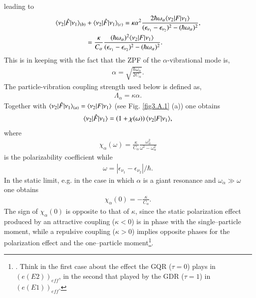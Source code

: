 leading to 
\begin{align}
\nonumber \langle {\nu_2|\hat F|\nu_1} \rangle_{(b)}&+\langle {\nu_2|\hat F|\nu_1} \rangle_{(c)}=\kappa\alpha^2\frac{2\hbar \omega_\alpha\langle {\nu_2|F|\nu_1} \rangle}{(\epsilon_{\nu_1}-\epsilon_{\nu_2})^2-(\hbar\omega_\alpha)^2},\\
&=\frac{\kappa}{C_\alpha}\frac{(\hbar\omega_\alpha)^2\langle {\nu_2|F|\nu_1} \rangle}{(\epsilon_{\nu_1}-\epsilon_{\nu_2})^2-(\hbar\omega_\alpha)^2}.
\end{align}
This is in keeping with the fact that the ZPF of the $\alpha$-vibrational mode is,
\begin{align}
\alpha=\sqrt{\frac{\hbar\omega_\alpha}{2C_\alpha}}.
\end{align}
The particle-vibration coupling strength used below is defined as,
\begin{align}
\Lambda_\alpha=\kappa\alpha.
\end{align}
Together with $\langle {\nu_2|\hat F|\nu_1} \rangle_{(a)}=\langle {\nu_2|F|\nu_1} \rangle$ (see Fig. \ref{fig3.A.1} (a)) one obtains
\begin{align}\label{eq3.A.12}
\langle {\nu_2|\hat F|\nu_1} \rangle=\left(1+\chi(\omega)\right)\langle {\nu_2|F|\nu_1} \rangle,
\end{align}
where
\begin{align}\label{eq3.A.13}
 \chi_\alpha(\omega)=\frac{\kappa}{C_\alpha}\frac{\omega_\alpha^2}{\omega^2-\omega_\alpha^2}
\end{align}
is the polarizability coefficient while
\begin{align}\label{eq3.A.14}
\omega=|\epsilon_{\nu_1}-\epsilon_{\nu_2}|/\hbar.
\end{align}
In the static limit, e.g. in the case in which $\alpha$ is a giant resonance and $\omega_\alpha\gg\omega$ one obtains
\begin{align}\label{eq3.A.15}
\chi_\alpha(0)=-\frac{\kappa}{C_\alpha}.
\end{align}
The sign of $\chi_\alpha(0)$ is opposite to that of $\kappa$, since the static polarization effect produced by an attractive coupling ($\kappa<0$) is in phase with the single--particle moment, while a repulsive coupling ($\kappa>0$) implies opposite phases for the polarization effect and the one--particle moment\footnote{\cite{Bohr:75,Mottelson:62}. Think in the first case about the effect the GQR ($\tau=0$) plays in $(e(E2))_{eff}$, in the second that played by the GDR ($\tau=1$) in $(e(E1))_{eff}$.}.



